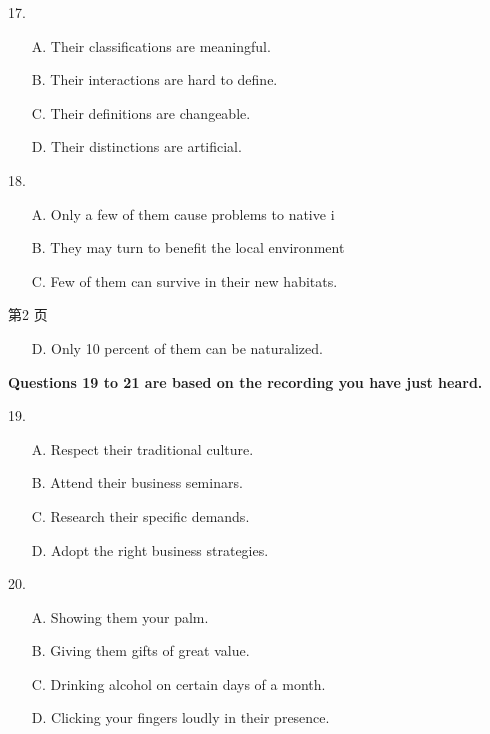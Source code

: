 \documentclass[UTF8,11pt]{ctexart}
\begin{document}
17.


\begin{itemize}[leftmargin=2em,itemsep=.2em,topsep=.4em]\item[A.] Their classifications are meaningful.
\item[B.] Their interactions are hard to define.
\item[C.] Their definitions are changeable.
\item[D.] Their distinctions are artificial.
\end{itemize}

18.


\begin{itemize}[leftmargin=2em,itemsep=.2em,topsep=.4em]\item[A.] Only a few of them cause problems to native i
\item[B.] They may turn to benefit the local environment
\item[C.] Few of them can survive in their new habitats.
\end{itemize}

第2 页


\begin{itemize}[leftmargin=2em,itemsep=.2em,topsep=.4em]\item[D.] Only 10 percent of them can be naturalized.
\end{itemize}

\textbf{Questions 19 to 21 are based on the recording you have just heard.}


19.


\begin{itemize}[leftmargin=2em,itemsep=.2em,topsep=.4em]\item[A.] Respect their traditional culture.
\item[B.] Attend their business seminars.
\item[C.] Research their specific demands.
\item[D.] Adopt the right business strategies.
\end{itemize}

20.


\begin{itemize}[leftmargin=2em,itemsep=.2em,topsep=.4em]\item[A.] Showing them your palm.
\item[B.] Giving them gifts of great value.
\item[C.] Drinking alcohol on certain days of a month.
\item[D.] Clicking your fingers loudly in their presence.
\end{itemize}
\end{document}
